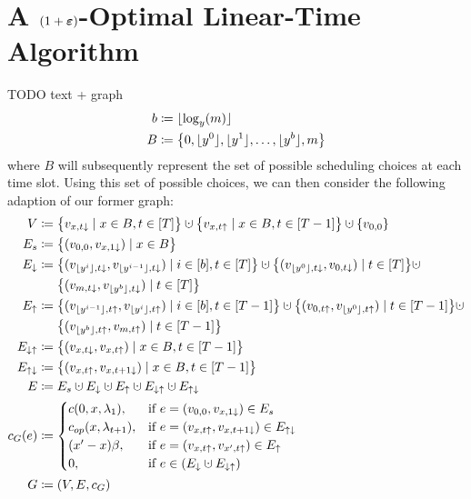 \section{A $(1+\boldsymbol\varepsilon)$-Optimal Linear-Time Algorithm}
TODO text + graph
\begin{align*}
	b&\coloneqq\lfloor\log_y(m)\rfloor\\
	B&\coloneqq\left\{0,\lfloor y^0\rfloor,\lfloor y^1\rfloor,\dotsc,\lfloor y^b\rfloor,m\right\}
\end{align*}
where $B$ will subsequently represent the set of possible scheduling choices at each time slot. Using this set of possible choices, we can then consider the following adaption of our former graph:
\begin{align*}
	V&\coloneqq\bigl\{v_{x,t\downarrow}\mid x\in B,t\in[T]\bigr\}\dotcup\bigl\{v_{x,t\uparrow}\mid x\in B, t\in[T-1]\bigr\}\dotcup\{v_{0,0}\}\\
	E_s&\coloneqq\bigl\{(v_{0,0},v_{x,1\downarrow})\mid x\in B\bigr\}\\
	E_\downarrow&\coloneqq\bigl\{(v_{\floor{y^i},t\downarrow},v_{\floor{y^{i-1}},t\downarrow})\mid i\in[b],t\in[T]\bigr\}\dotcup\bigl\{(v_{\floor{y^0},t\downarrow},v_{0,t\downarrow})\mid t\in[T]\bigr\}\dotcup\\
	&\phantom{{}\coloneqq{}}\bigl\{(v_{m,t\downarrow},v_{\floor{y^b},t\downarrow})\mid t\in[T]\bigr\}\\
	E_\uparrow&\coloneqq\bigl\{(v_{\floor{y^{i-1}},t\uparrow},v_{\floor{y^i},t\uparrow})\mid i\in[b],t\in[T-1]\bigr\}\dotcup\bigl\{(v_{0,t\uparrow},v_{\floor{y^0},t\uparrow})\mid t\in[T-1]\bigr\}\dotcup\\
	&\phantom{{}\coloneqq{}}\bigl\{(v_{\floor{y^b},t\uparrow},v_{m,t\uparrow})\mid t\in[T-1]\bigr\}\\
	E_{\downarrow\uparrow}&\coloneqq\bigl\{(v_{x,t\downarrow},v_{x,t\uparrow})\mid x\in B,t\in[T-1]\bigr\}\\
	E_{\uparrow\downarrow}&\coloneqq\bigl\{(v_{x,t\uparrow},v_{x,t+1\downarrow})\mid x\in B,t\in[T-1]\bigr\}\\
	E&\coloneqq E_s\dotcup E_\downarrow\dotcup E_\uparrow\dotcup E_{\downarrow\uparrow}\dotcup E_{\uparrow\downarrow}\\
	c_G(e)&\coloneqq
	\begin{cases}
		\costs(0,x,\lambda_1), & \text{if $e=(v_{0,0},v_{x,1\downarrow})\in E_s$}\\
		\opcosts(x,\lambda_{t+1}), & \text{if $e=(v_{x,t\uparrow},v_{x,t+1\downarrow})\in E_{\uparrow\downarrow}$}\\
		(x'-x)\beta, & \text{if $e=(v_{x,t\uparrow},v_{x',t\uparrow})\in E_\uparrow$}\\
		0, & \text{if $e\in(E_\downarrow\dotcup E_{\downarrow\uparrow})$}
	\end{cases}\\
	G&\coloneqq(V,E,c_G)
\end{align*}
